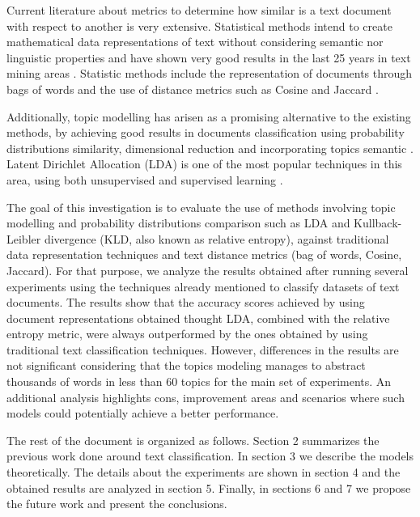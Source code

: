 \documentclass[preprint,12pt,3p]{elsarticle}
\begin{document}
Current literature about metrics to determine how similar is a text document with respect to another is very extensive. Statistical methods intend to create mathematical data representations of text without considering semantic nor linguistic properties and have shown very good results in the last 25 years in text mining areas \cite{srivastava2009text}. Statistic methods include the representation of documents through bags of words and the use of distance metrics such as Cosine and Jaccard \cite{kocher2017distance,soto2015similarity}. \par

Additionally, topic modelling has arisen as a promising alternative to the existing methods, by achieving good results in documents classification using probability distributions similarity, dimensional reduction and incorporating topics semantic \cite{ bae2014computing, bougiatiotis2016content, pavlinek2017text}. Latent Dirichlet Allocation (LDA) is one of the most popular techniques in this area, using both unsupervised and supervised learning \cite{mcauliffe2008supervised}. \par

The goal of this investigation is to evaluate the use of methods involving topic modelling and probability distributions comparison such as LDA and Kullback-Leibler divergence (KLD, also known as relative entropy), against traditional data representation techniques and text distance metrics (bag of words, Cosine, Jaccard). For that purpose, we analyze the results obtained after running several experiments using the techniques already mentioned to classify datasets of text documents. The results show that the accuracy scores achieved by using document representations obtained thought LDA, combined with the relative entropy metric, were always outperformed by the ones obtained by using traditional text classification techniques. However, differences in the results are not significant considering that the topics modeling manages to abstract thousands of words in less than 60 topics for the main set of experiments. An additional analysis highlights cons, improvement areas and scenarios where such models could potentially achieve a better performance. \par

The rest of the document is organized as follows. Section 2 summarizes the previous work done around text classification. In section 3 we describe the models theoretically. The details about the experiments are shown in section 4 and the obtained results are analyzed in section 5. Finally, in sections 6 and 7 we propose the future work and present the conclusions.
\end{document}
